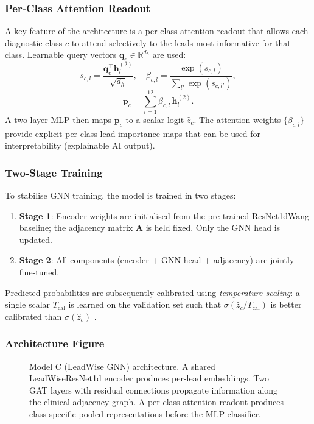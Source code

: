 \subsubsection{Per-Class Attention Readout}

A key feature of the architecture is a per-class attention readout that
allows each diagnostic class $c$ to attend selectively to the leads most
informative for that class.
Learnable query vectors $\mathbf{q}_c \in \mathbb{R}^{d_h}$ are used:
\begin{equation}
  s_{c,l} = \frac{\mathbf{q}_c^\top \mathbf{h}_l^{(2)}}{\sqrt{d_h}},
  \quad
  \beta_{c,l} = \frac{\exp(s_{c,l})}{\sum_{l'}\exp(s_{c,l'})},
  \label{eq:class_readout}
\end{equation}
\begin{equation}
  \mathbf{p}_c = \sum_{l=1}^{12} \beta_{c,l}\, \mathbf{h}_l^{(2)}.
  \label{eq:class_pool}
\end{equation}
A two-layer MLP then maps $\mathbf{p}_c$ to a scalar logit $\hat{z}_c$.
The attention weights $\{\beta_{c,l}\}$ provide explicit per-class
lead-importance maps that can be used for interpretability
(explainable AI output).

\subsubsection{Two-Stage Training}

To stabilise GNN training, the model is trained in two stages:
\begin{enumerate}
  \item \textbf{Stage 1}: Encoder weights are initialised from the
        pre-trained ResNet1dWang baseline; the adjacency matrix
        $\mathbf{A}$ is held fixed.
        Only the GNN head is updated.
  \item \textbf{Stage 2}: All components (encoder + GNN head + adjacency)
        are jointly fine-tuned.
\end{enumerate}
Predicted probabilities are subsequently calibrated using
\emph{temperature scaling}: a single scalar $T_\mathrm{cal}$ is learned
on the validation set such that $\sigma(\hat{z}_c / T_\mathrm{cal})$
is better calibrated than $\sigma(\hat{z}_c)$ \cite{ref24}.

\subsubsection{Architecture Figure}

\begin{figure}[htbp]
  \centering
  \caption{Model C (LeadWise GNN) architecture.
    A shared LeadWiseResNet1d encoder produces per-lead embeddings.
    Two GAT layers with residual connections propagate information
    along the clinical adjacency graph.
    A per-class attention readout produces class-specific pooled
    representations before the MLP classifier.}
  \label{fig:model_c}
\end{figure}

